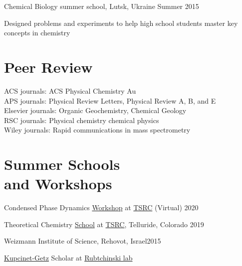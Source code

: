 \documentclass[margin,line]{res}
\newenvironment{list1}{
  \begin{list}{\ding{113}}{%
      \setlength{\itemsep}{0in}
      \setlength{\parsep}{0in} \setlength{\parskip}{0in}
      \setlength{\topsep}{0in} \setlength{\partopsep}{0in} 
      \setlength{\leftmargin}{0.17in}}}{\end{list}}
\begin{document}
\begin{resume}
Chemical Biology summer school, Lutsk, Ukraine \hfill{Summer 2015}

\begin{list1}
\item[]
Designed problems and experiments to help high school students master key concepts in chemistry
\end{list1}

\section{\sc Peer Review}
ACS journals: ACS Physical Chemistry Au\\
APS journals: Physical Review Letters, Physical Review A, B, and E\\
Elsevier journals: Organic Geochemistry, Chemical Geology\\ 
RSC journals: Physical chemistry chemical physics\\
Wiley journals: Rapid communications in mass spectrometry

\section{\sc Summer Schools\\and Workshops}
%
%
Condensed Phase Dynamics  \href{https://meetings.telluridescience.org/meetings/workshop-details?wid=829}{Workshop} at \href{https://www.telluridescience.org/schools/tellurideschoolontheoreticalchemistry}{TSRC} (Virtual) \hfill {2020}

\vspace*{-2.5mm}

Theoretical Chemistry \href{https://meetings.telluridescience.org/meetings/workshop-details?wid=775}{School} at \href{https://www.telluridescience.org/schools/tellurideschoolontheoreticalchemistry}{TSRC}, Telluride, Colorado \hfill {2019}

\vspace*{-2.5mm}

Weizmann Institute of Science, Rehovot, Israel\hfill{2015}\\
\vspace*{-.1in}
\begin{list1}
\item[] \href{https://www.weizmann.ac.il/feinberg/admissions/kupcinet-getz-international-summer-school/about-program-0}{Kupcinet-Getz} Scholar at \href{https://www.weizmann.ac.il/Organic_Chemistry/Rybtchinski/}{Rubtchinski lab}
\end{list1}


\end{resume}
\end{document}

